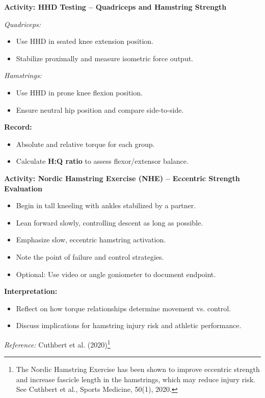 \begin{labactivitybox}
\textbf{Activity: HHD Testing – Quadriceps and Hamstring Strength}

\textit{Quadriceps:}
\begin{itemize}
  \item Use HHD in seated knee extension position.
  \item Stabilize proximally and measure isometric force output.
\end{itemize}

\textit{Hamstrings:}
\begin{itemize}
  \item Use HHD in prone knee flexion position.
  \item Ensure neutral hip position and compare side-to-side.
\end{itemize}

\textbf{Record:}
\begin{itemize}
  \item Absolute and relative torque for each group.
  \item Calculate \textbf{H:Q ratio} to assess flexor/extensor balance.
\end{itemize}
\end{labactivitybox}

\begin{labactivitybox}
\textbf{Activity: Nordic Hamstring Exercise (NHE) – Eccentric Strength Evaluation}

\begin{itemize}
  \item Begin in tall kneeling with ankles stabilized by a partner.
  \item Lean forward slowly, controlling descent as long as possible.
  \item Emphasize slow, eccentric hamstring activation.
  \item Note the point of failure and control strategies.
  \item Optional: Use video or angle goniometer to document endpoint.
\end{itemize}

\textbf{Interpretation:}
\begin{itemize}
  \item Reflect on how torque relationships determine movement vs. control.
  \item Discuss implications for hamstring injury risk and athletic performance.
\end{itemize}

\textit{Reference:} Cuthbert et al. (2020)\footnote{The Nordic Hamstring Exercise has been shown to improve eccentric strength and increase fascicle length in the hamstrings, which may reduce injury risk. See Cuthbert et al., Sports Medicine, 50(1), 2020.}
\end{labactivitybox}

